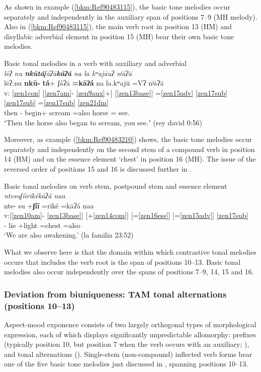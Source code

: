 \documentclass[output=paper]{langscibook}
\begin{document}
As shown in example (\ref{bkm:Ref90483115}), the basic tone melodies occur separately and independently in the auxiliary span of positions 7{}--9 (MH melody). Also in (\ref{bkm:Ref90483115}), the main verb root in position 13 (HM) and disyllabic adverbial element in position 15 (MH) bear their own basic tone melodies.

\ea\label{bkm:Ref90483115}Basic tonal melodies in a verb with auxiliary and adverbial\\
\textit{lēʔ nu \textbf{nkūtá}ʃáʔā\textbf{kāʔá} na la kʷajūuʔ nʲāʔā}\\
\glll {} lēʔ.nu \textbf{nkū-} \textbf{tá}+ ʃáʔā \textbf{=kāʔá} na la.kʷajū =Vʔ nʲāʔā\\
v: \ref{zen1con} [\ref{zen7am}{}- \ref{zen9aux}+] [\ref{zen13base}] =\ref{zen15adv} \ref{zen17sub} \ref{zen17sub} =\ref{zen17sub} \ref{zen21dm} \\
{} then \Pfv{}- begin+ scream =also \Def{} horse =\Ana{} see.\Second\Sg{}\\
\glt ʻThen the horse also began to scream, you see.ʼ (rey david 0:56)
\z

Moreover, as example (\ref{bkm:Ref90483210}) shows, the basic tone melodies occur separately and independently on the second stem of a compound verb in position 14 (HM) and on the essence element `chest' in position 16 (MH). The issue of the reversed order of positions 15 and 16 is discussed further in .


\ea\label{bkm:Ref90483210}Basic tonal melodies on verb stem, postpound stem and essence element\\
\textit{ntesuʃíīrīkékāʔá naa}\\
\glll nte- su +\textbf{ʃíī} =rīké =kāʔá naa\\
v:[\ref{zen10am}{}- \ref{zen13base}] [+\ref{zen14com}] [=\ref{zen16ess}] [=\ref{zen15adv}] \ref{zen17sub} \\
\Prog{}- lie +light =chest =also \First\Incl{}\\
\glt `We are also awakening.' (la familia 23:52)
\z

What we observe here is that the domain within which contrastive tonal melodies occurs that includes the verb root is the span of positions 10{}--13. Basic tonal melodies also occur independently over the spans of positions 7{}--9, 14, 15 and 16. 

\subsubsection{Deviation from biuniqueness: TAM tonal alternations (positions 10{}--13)}
\label{bkm:Ref113308071}
Aspect-mood exponence consists of two largely orthogonal types of morphological expression, each of which displays significantly unpredictable allomorphy: prefixes (typically position 10, but position 7 when the verb occurs with an auxiliary; \citealt{Campbell2011}), and tonal alternations (\citealt{Campbell2016,Campbell2019}). Single-stem (non-compound) inflected verb forms bear one of the five basic tone melodies just discussed in , spanning positions 10{}--13.
\end{document}
